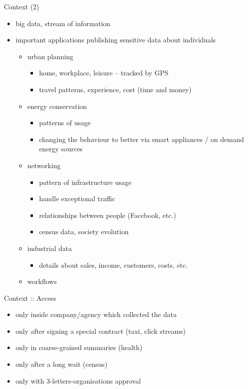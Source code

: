 \documentclass{beamer}
\begin{document}
\begin{frame}{Context (2)}
  \begin{itemize}
    \item big data, stream of information
  \end{itemize}
  \begin{itemize}[<+->]
    \item important applications publishing sensitive data about individuals
      \begin{itemize}
        \item urban planning
          \begin{itemize}
            \item home, workplace, leisure -- tracked by GPS
            \item travel patterns, experience, cost (time and money)
          \end{itemize}
        \item energy conservation
          \begin{itemize}
            \item patterns of usage
            \item changing the behaviour to better via smart appliances / on
              demand energy sources
          \end{itemize}
        \item networking
          \begin{itemize}
            \item pattern of infrastructure usage
            \item handle exceptional traffic
            \item relationships between people (Facebook, etc.)
            \item census data, society evolution
          \end{itemize}
        \item industrial data
          \begin{itemize}
            \item details about sales, income, customers, costs, etc.
          \end{itemize}
        \item workflows
      \end{itemize}
  \end{itemize}
\end{frame}

\begin{frame}{Context :: Access}
  \color{red}{Access strictly controlled}
  \begin{itemize}[<+->]
    \item only inside company/agency which collected the data
    \item only after signing a special contract (taxi, click streams)
    \item only in coarse-grained summaries (health)
    \item only after a long wait (census)
    \item only with 3-letters-organisations approval
  \end{itemize}
\end{frame}
\end{document}
